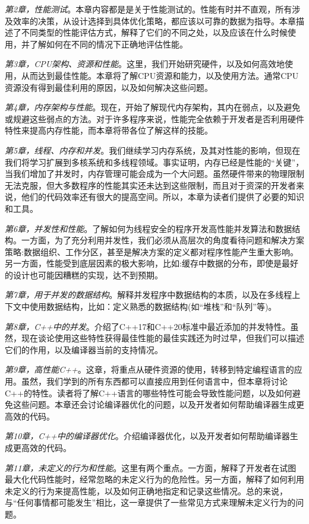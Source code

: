 \textit{第2章，性能测试}。本章内容都是是关于性能测试的。性能有时并不直观，所有涉及效率的决策，从设计选择到具体优化策略，都应该以可靠的数据为指导。本章描述了不同类型的性能评估方式，解释了它们的不同之处，以及应该在什么时候使用，并了解如何在不同的情况下正确地评估性能。

\textit{第3章，CPU架构、资源和性能}。这里，我们开始研究硬件，以及如何高效地使用，从而达到最佳性能。本章将了解CPU资源和能力，以及使用方法。通常CPU资源没有得到最佳利用的原因，以及如何解决这些问题。

\textit{第4章，内存架构与性能}。现在，开始了解现代内存架构，其内在弱点，以及避免或规避这些弱点的方法。对于许多程序来说，性能完全依赖于开发者是否利用硬件特性来提高内存性能，而本章将带各位了解这样的技能。

\textit{第5章，线程、内存和并发}。我们继续学习内存系统，及其对性能的影响，但现在我们将学习扩展到多核系统和多线程领域。事实证明，内存已经是性能的“关键”，当我们增加了并发时，内存管理可能会成为一个大问题。虽然硬件带来的物理限制无法克服，但大多数程序的性能其实还未达到这些限制，而且对于资深的开发者来说，他们的代码效率还有很大的提高空间。所以，本章为读者们提供了必要的知识和工具。

\textit{第6章，并发性和性能}。了解如何为线程安全的程序开发高性能并发算法和数据结构。一方面，为了充分利用并发性，我们必须从高层次的角度看待问题和解决方案策略:数据组织、工作分区，甚至是解决方案的定义都对程序性能产生重大影响。另一方面，性能受到底层因素的极大影响，比如:缓存中数据的分布，即使是最好的设计也可能因糟糕的实现，达不到预期。

\textit{第7章，用于并发的数据结构}。解释并发程序中数据结构的本质，以及在多线程上下文中使用数据结构，比如：定义熟悉的数据结构(如“堆栈”和“队列”等)。

\textit{第8章，C++中的并发}。介绍了C++17和C++20标准中最近添加的并发特性。虽然，现在谈论使用这些特性获得最佳性能的最佳实践还为时过早，但我们可以描述它们的作用，以及编译器当前的支持情况。

\textit{第9章，高性能C++}。这章，将重点从硬件资源的使用，转移到特定编程语言的应用。虽然，我们学到的所有东西都可以直接应用到任何语言中，但本章将讨论C++的特性。读者将了解C++语言的哪些特性可能会导致性能问题，以及如何避免这些问题。本章还会讨论编译器优化的问题，以及开发者如何帮助编译器生成更高效的代码。

\textit{第10章，C++中的编译器优化}。介绍编译器优化，以及开发者如何帮助编译器生成更高效的代码。

\textit{第11章，未定义的行为和性能}。这里有两个重点。一方面，解释了开发者在试图最大化代码性能时，经常忽略的未定义行为的危险性。另一方面，解释了如何利用未定义的行为来提高性能，以及如何正确地指定和记录这些情况。总的来说，与“任何事情都可能发生”相比，这一章提供了一些常见方式来理解未定义行为的问题。

